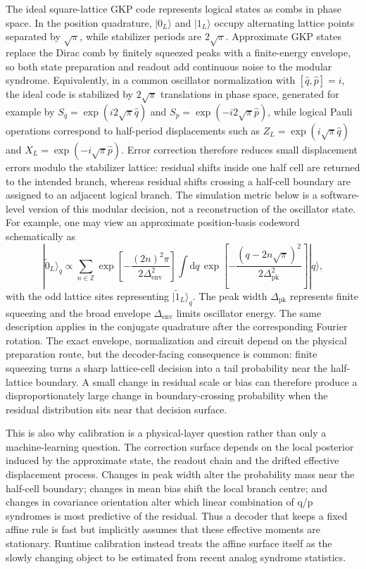 \documentclass[11pt]{article}
\begin{document}
The ideal square-lattice GKP code represents logical states as combs in phase
space.  In the position quadrature, \(|0_L\rangle\) and \(|1_L\rangle\)
occupy alternating lattice points separated by \(\sqrt{\pi}\), while
stabilizer periods are \(2\sqrt{\pi}\).  Approximate GKP states replace the
Dirac comb by finitely squeezed peaks with a finite-energy envelope, so both
state preparation and readout add continuous noise to the modular syndrome.
Equivalently, in a common oscillator normalization with
\([\hat q,\hat p]=i\), the ideal code is stabilized by \(2\sqrt{\pi}\)
translations in phase space, generated for example by
\(S_q=\exp(i2\sqrt{\pi}\hat q)\) and
\(S_p=\exp(-i2\sqrt{\pi}\hat p)\), while logical Pauli operations correspond
to half-period displacements such as
\(Z_L=\exp(i\sqrt{\pi}\hat q)\) and
\(X_L=\exp(-i\sqrt{\pi}\hat p)\).  Error correction therefore reduces
small displacement errors modulo the stabilizer lattice: residual shifts inside
one half cell are returned to the intended branch, whereas residual shifts
crossing a half-cell boundary are assigned to an adjacent logical branch.  The
simulation metric below is a software-level version of this modular decision,
not a reconstruction of the oscillator state.
For example, one may view an approximate position-basis codeword schematically
as
\begin{equation}
    |\widetilde{0}_L\rangle_q
    \propto
    \sum_{n\in\mathbb{Z}}
    \exp\!\left[-\frac{(2n)^2\pi}{2\Delta_{\mathrm{env}}^2}\right]
    \int \mathrm{d}q\,
    \exp\!\left[-\frac{(q-2n\sqrt{\pi})^2}{2\Delta_{\mathrm{pk}}^2}\right]
    |q\rangle ,
    \label{eq:approx-gkp-comb}
\end{equation}
with the odd lattice sites representing \(|\widetilde{1}_L\rangle_q\).  The
peak width \(\Delta_{\mathrm{pk}}\) represents finite squeezing and the broad
envelope \(\Delta_{\mathrm{env}}\) limits oscillator energy.  The same
description applies in the conjugate quadrature after the corresponding Fourier
rotation.  The exact envelope, normalization and circuit depend on the physical
preparation route, but the decoder-facing consequence is common: finite
squeezing turns a sharp lattice-cell decision into a tail probability near the
half-lattice boundary.  A small change in residual scale or bias can therefore
produce a disproportionately large change in boundary-crossing probability when
the residual distribution sits near that decision surface.

This is also why calibration is a physical-layer question rather than only a
machine-learning question.  The correction surface depends on the local
posterior induced by the approximate state, the readout chain and the drifted
effective displacement process.  Changes in peak width alter the probability
mass near the half-cell boundary; changes in mean bias shift the local branch
centre; and changes in covariance orientation alter which linear combination of
q/p syndromes is most predictive of the residual.  Thus a decoder that keeps a
fixed affine rule is fast but implicitly assumes that these effective moments
are stationary.  Runtime calibration instead treats the affine surface itself
as the slowly changing object to be estimated from recent analog syndrome
statistics.
\end{document}
